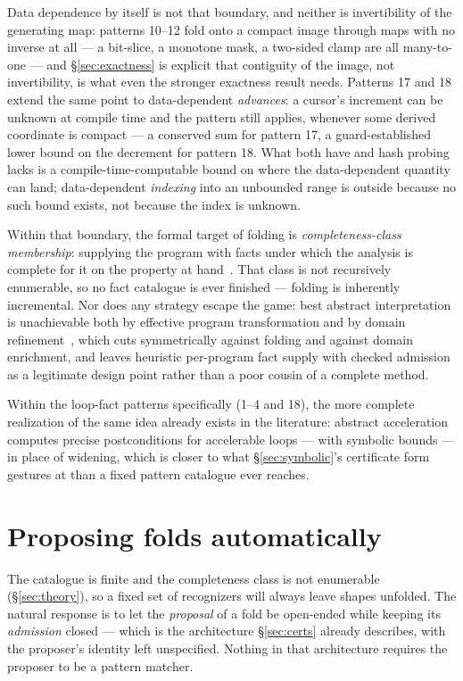 \documentclass[11pt,a4paper]{article}
\begin{document}
Data dependence by itself is not that boundary, and neither is invertibility of the
generating map: patterns 10--12 fold onto a compact image through maps with no inverse
at all --- a bit-slice, a monotone mask, a two-sided clamp are all many-to-one --- and
\S\ref{sec:exactness} is explicit that contiguity of the image, not invertibility, is
what even the stronger exactness result needs. Patterns 17 and 18 extend the same point
to data-dependent \emph{advances}: a cursor's increment can be unknown at compile time
and the pattern still applies, whenever some derived coordinate is compact --- a
conserved sum for pattern 17, a guard-established lower bound on the decrement for
pattern 18. What both have and hash probing lacks is a compile-time-computable bound on
where the data-dependent quantity can land; data-dependent \emph{indexing} into an
unbounded range is outside because no such bound exists, not because the index is
unknown.

Within that boundary, the formal target of folding is \emph{completeness-class
membership}: supplying the program with facts under which the analysis is complete for it
on the property at hand~\cite{giacobazzi2015}. That class is not recursively enumerable,
so no fact catalogue is ever finished --- folding is inherently incremental. Nor does any
strategy escape the game: best abstract interpretation is unachievable both by effective
program transformation and by domain refinement~\cite{giacobazzi2025}, which cuts
symmetrically against folding and against domain enrichment, and leaves heuristic
per-program fact supply with checked admission as a legitimate design point rather than a
poor cousin of a complete method.

Within the loop-fact patterns specifically (1--4 and 18), the more complete realization
of the same idea already exists in the literature: abstract
acceleration~\cite{gonnord2006,jeannet2014} computes precise postconditions for
accelerable loops --- with symbolic bounds --- in place of widening, which is closer to
what \S\ref{sec:symbolic}'s certificate form gestures at than a fixed pattern catalogue
ever reaches.

\section{Proposing folds automatically}
\label{sec:ai}

The catalogue is finite and the completeness class is not enumerable (\S\ref{sec:theory}),
so a fixed set of recognizers will always leave shapes unfolded. The natural response is
to let the \emph{proposal} of a fold be open-ended while keeping its \emph{admission}
closed --- which is the architecture \S\ref{sec:certs} already describes, with the
proposer's identity left unspecified. Nothing in that architecture requires the proposer
to be a pattern matcher.
\end{document}
